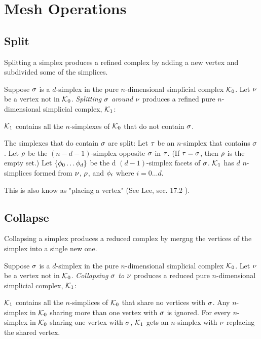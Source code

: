
\section{Mesh Operations}
\label{sec:mesh-operations}

\subsection{Split}

Splitting a simplex produces a refined complex by adding a new vertex
and subdivided some of the simplices.


Suppose $\sigma$ is a $d$-simplex
in the pure $n$-dimensional simplicial complex $\mathcal{K}_0$.
Let $\nu$ be a vertex not in $\mathcal{K}_0$.
{\it Splitting $\sigma$ around $\nu$}
produces a refined pure $n$-dimensional simplicial complex, $\mathcal{K}_1$:

$\mathcal{K}_1$ contains all the  $n$-simplexes of $\mathcal{K}_0$
that do not contain $\sigma$.

The simplexes that do contain $\sigma$ are split:
Let $\tau$ be an $n$-simplex that contains $\sigma$.
Let $\rho$ be the $(n-d-1)$-simplex opposite $\sigma$
in $\tau$.
(If $\tau = \sigma$, then $\rho$ is the empty set.)
Let $\{ \phi_0 \ldots \phi_d \}$ be the
d $(d-1)$-simplex facets of $\sigma$.
$\mathcal{K}_1$ has
$d$ $n$-simplices formed from
$\nu$, $\rho$, and
$\phi_i$ where $i=0 \ldots d$.

This is also know as "placing a vertex" (See Lee, sec. 17.2 \cite{lee-hdcg-17-2004}).

\subsection{Collapse}

Collapsing a simplex produces a reduced complex by mergng
the vertices of the simplex into a single new one.

Suppose $\sigma$ is a $d$-simplex
in the pure $n$-dimensional simplicial complex $\mathcal{K}_0$.
Let $\nu$ be a vertex not in $\mathcal{K}_0$.
{\it Collapsing $\sigma$ to $\nu$}
produces a reduced pure $n$-dimensional simplicial complex, $\mathcal{K}_1$:

$\mathcal{K}_1$ contains all the
$n$-simplices of $\mathcal{K}_0$ that share no vertices with $\sigma$.
Any $n$-simplex in $\mathcal{K}_0$ sharing more than one vertex
with $\sigma$ is ignored.
For every $n$-simplex in $\mathcal{K}_0$ sharing one vertex with $\sigma$,
$\mathcal{K}_1$ gets an $n$-simplex with $\nu$ replacing the
shared vertex.

